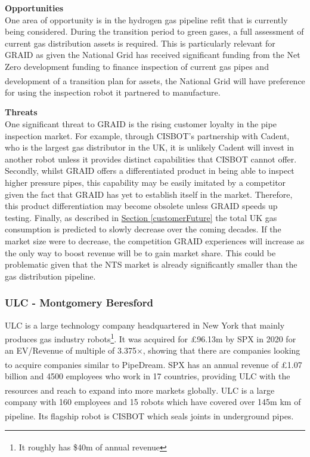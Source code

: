 \documentclass[11pt]{article}		%
\newcommand{\supercite}[1]{\textsuperscript{\cite{#1}}}		%
\newcommand{\sectref}[1]{\hyperref[#1]{Section \ref*{#1}}}     %
\begin{document}
	        \textbf{Opportunities}\\
	        One area of opportunity is in the hydrogen gas pipeline refit that is currently being considered. During the transition period to green gases, a full assessment of current gas distribution assets is required. This is particularly relevant for GRAID as given the National Grid has received significant funding from the Net Zero development funding to finance inspection of current gas pipes and development of a transition plan for assets\supercite{developmentfund}, the National Grid will have preference for using the inspection robot it partnered to manufacture.
	        
	        \textbf{Threats} \\
	        One significant threat to GRAID is the rising customer loyalty in the pipe inspection market. For example, through CISBOT's partnership with Cadent, who is the largest gas distributor in the UK, it is unlikely Cadent will invest in another robot unless it provides distinct capabilities that CISBOT cannot offer. Secondly, whilst GRAID offers a differentiated product in being able to inspect higher pressure pipes, this capability may be easily imitated by a competitor given the fact that GRAID has yet to establish itself in the market. Therefore, this product differentiation may become obsolete unless GRAID speeds up testing.
	        Finally, as described in \sectref{customerFuture} the total UK gas consumption is predicted to slowly decrease over the coming decades. If the market size were to decrease, the competition GRAID experiences will increase as the only way to boost revenue will be to gain market share. This could be problematic given that the NTS market is already significantly smaller than the gas distribution pipeline.  
	        
     	\subsubsection[ULC]{ULC - Montgomery Beresford}
     	
     	ULC is a large technology company headquartered in New York that mainly produces gas industry robots\footnote{It roughly has \$40m of annual revenue\supercite{SPX_acquisition}}. It was acquired for £96.13m by SPX in 2020 for an EV/Revenue of multiple of 3.375$\times$, showing that there are companies looking to acquire companies similar to PipeDream\supercite{SPX_multiple}. SPX has an annual revenue of £1.07 billion and 4500 employees who work in 17 countries, providing ULC with the resources and reach to expand into more markets globally\supercite{SPX_acquisition}. ULC is a large company with 160 employees and  15 robots which have covered over 145m km of pipeline\supercite{ULC_news}. Its flagship robot is CISBOT which seals joints in underground pipes.%
     	
\end{document}
